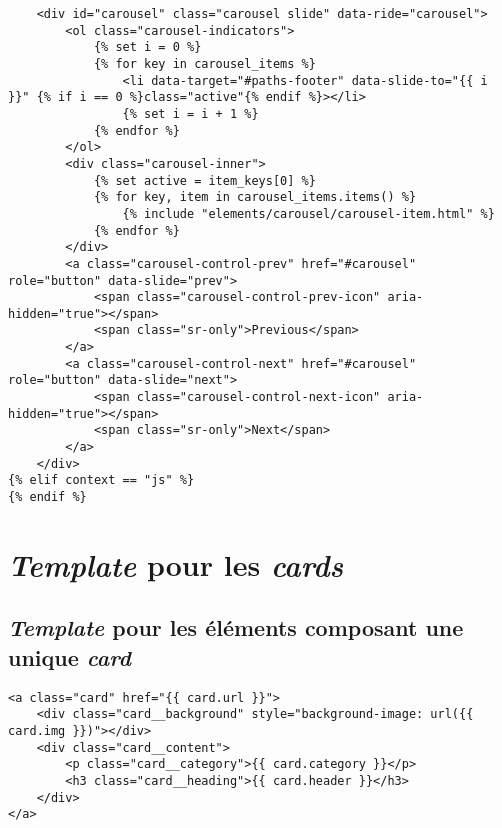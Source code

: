 \documentclass{article}
\begin{document}
\begin{verbatim}
    <div id="carousel" class="carousel slide" data-ride="carousel">
        <ol class="carousel-indicators">
            {% set i = 0 %}
            {% for key in carousel_items %}
                <li data-target="#paths-footer" data-slide-to="{{ i }}" {% if i == 0 %}class="active"{% endif %}></li>
                {% set i = i + 1 %}
            {% endfor %}
        </ol>
        <div class="carousel-inner">
            {% set active = item_keys[0] %}
            {% for key, item in carousel_items.items() %}
                {% include "elements/carousel/carousel-item.html" %}
            {% endfor %}
        </div>
        <a class="carousel-control-prev" href="#carousel" role="button" data-slide="prev">
            <span class="carousel-control-prev-icon" aria-hidden="true"></span>
            <span class="sr-only">Previous</span>
        </a>
        <a class="carousel-control-next" href="#carousel" role="button" data-slide="next">
            <span class="carousel-control-next-icon" aria-hidden="true"></span>
            <span class="sr-only">Next</span>
        </a>
    </div>
{% elif context == "js" %}
{% endif %}

\end{verbatim}

\section{\textit{Template} pour les \textit{cards}}
\subsection{\textit{Template} pour les éléments composant une unique \textit{card}}
\begin{verbatim}
<a class="card" href="{{ card.url }}">
    <div class="card__background" style="background-image: url({{ card.img }})"></div>
    <div class="card__content">
        <p class="card__category">{{ card.category }}</p>
        <h3 class="card__heading">{{ card.header }}</h3>
    </div>
</a>
\end{verbatim}
\end{document}
